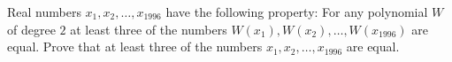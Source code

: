 Real numbers $x_1,x_2,\ldots ,x_{1996}$ have the following property: For any polynomial $W$ of degree $2$ at least three of the numbers $W(x_1),W(x_2),\ldots ,W(x_{1996})$ are equal. Prove that at least three of the numbers $x_1,x_2,\ldots ,x_{1996}$ are equal.